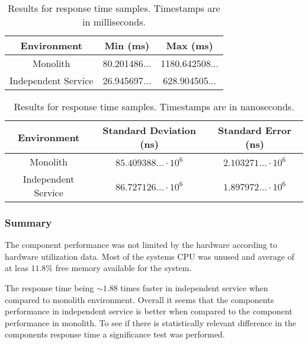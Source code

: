 \begin{table}[h!]
    \begin{tabular}{|c|c|c|} 
        \hline
        Environment
        & Min (ms)
        & Max (ms) \\ [0.5ex] 
        
        \hline\hline
        Monolith
        & 80.201486... 
        & 1180.642508... \\ 
        
        Independent Service
        & 26.945697... 
        & 628.904505...  \\
        \hline
    \end{tabular}
    \caption{Results for response time samples. Timestamps are in milliseconds.}
    \label{table:response time results:2}
\end{table}

\begin{table}[h!]
    \begin{tabular}{|c|c|c|} 
        \hline
        Environment
        & Standard Deviation (ns)
        & Standard Error (ns) \\ [0.5ex] 
        
        \hline\hline
        Monolith
        & $85.409388... \cdot 10^6$
        & $2.103271... \cdot 10^6$ \\ 
        
        Independent Service
        & $86.727126... \cdot 10^6$
        & $1.897972... \cdot 10^6$ \\ 
         \hline
    \end{tabular}
    \caption{Results for response time samples. Timestamps are in nanoseconds.}
    \label{table:response time results:3}
\end{table}

\subsubsection{Summary}
The component performance was not limited by the hardware according to hardware utilization data.
Most of the systems CPU was unused and average of at leas $11.8\%$ free memory available for the system.

The response time being $\sim1.88$ times faster in independent service when compared to monolith environment.
Overall it seems that the components performance in independent service is better when compared to the component performance in monolith.
To see if there is statistically relevant difference in the components response time a significance test was performed.

